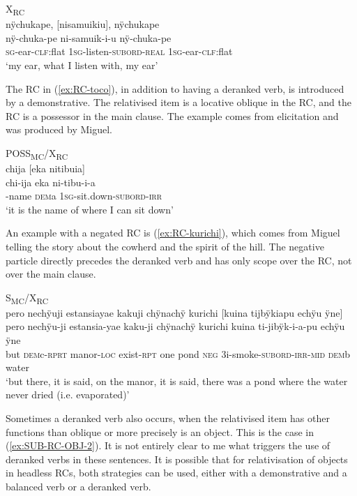 \ea\label{ex:Ear-RC}
\begingl
\glpreamble  \textup{X\textsubscript{RC}}\\nÿchukape, \textup{[}nisamuikiu\textup{]}, nÿchukape\\
\gla nÿ-chuka-pe ni-samuik-i-u nÿ-chuka-pe\\
\textsc{sg}-ear-\textsc{clf:}flat 1\textsc{sg}-listen-\textsc{subord}-\textsc{real} 1\textsc{sg}-ear-\textsc{clf:}flat\\
\glft ‘my ear, what I listen with, my ear’
\endgl
\trailingcitation{[rxx-e121128s-4x.078-079]}
\xe

The RC in (\ref{ex:RC-toco}), in addition to having a deranked verb, is introduced by a demonstrative. The relativised item is a locative oblique in the RC, and the RC is a possessor in the main clause. The example comes from elicitation and was produced by Miguel.

\ea\label{ex:RC-toco}
\begingl
\glpreamble  \textup{POSS\textsubscript{MC}/X\textsubscript{RC}}\\chija \textup{[}eka nitibuia\textup{]}\\
\gla chi-ija eka ni-tibu-i-a\\
-name \textsc{dem}a 1\textsc{sg}-sit.down-\textsc{subord}-\textsc{irr}\\
\glft ‘it is the name of where I can sit down’
\endgl
\trailingcitation{[rmx-e150922l.126]}
\xe

An example with a negated RC is (\ref{ex:RC-kurichi}), which comes from Miguel telling the story about the cowherd and the spirit of the hill. The negative particle directly precedes the deranked verb and has only scope over the RC, not over the main clause.

\ea\label{ex:RC-kurichi}
\begingl 
\glpreamble \textup{S\textsubscript{MC}/X\textsubscript{RC}}\\pero nechÿuji estansiayae kakuji chÿnachÿ kurichi \textup{[}kuina tijbÿkiapu echÿu ÿne\textup{]}\\
\gla pero nechÿu-ji estansia-yae kaku-ji chÿnachÿ kurichi kuina ti-jibÿk-i-a-pu echÿu ÿne\\ 
\glb but \textsc{dem}c-\textsc{rprt} manor-\textsc{loc} exist-\textsc{rpt} one pond \textsc{neg} 3i-smoke-\textsc{subord}-\textsc{irr}-\textsc{mid} \textsc{dem}b water\\ 
\glft ‘but there, it is said, on the manor, it is said, there was a pond where the water never dried (i.e. evaporated)’
\trailingcitation{[mxx-n151017l-1.06-07]}
\xe
{}

Sometimes a deranked verb also occurs, when the relativised item has other functions than oblique or more precisely is an object. This is the case in (\ref{ex:SUB-RC-OBJ-2}). It is not entirely clear to me what triggers the use of deranked verbs in these sentences. It is possible that for relativisation of objects in headless RCs, both strategies can be used, either with a demonstrative and a balanced verb or a deranked verb. 

